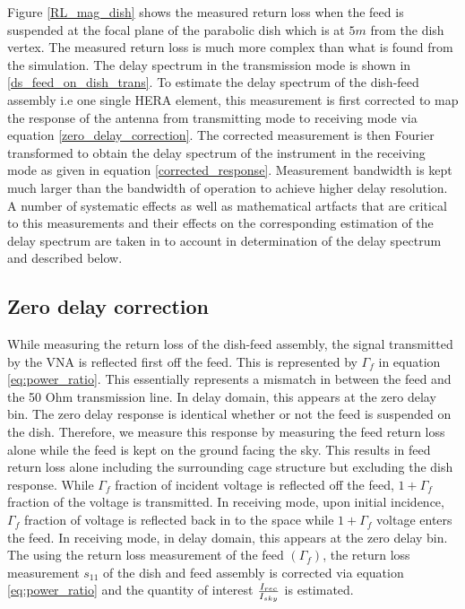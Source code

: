 \documentclass[twocolumn]{emulateapj}
\begin{document}
Figure \ref{RL_mag_dish} shows the measured return loss when the feed is suspended at the focal plane of the parabolic dish which is at $5m$ from the dish vertex. The measured return loss is much more complex than what is found from the simulation. The delay spectrum in the transmission mode is shown in \ref{ds_feed_on_dish_trans}. To estimate the delay spectrum of the dish-feed assembly i.e one single HERA element, this measurement is first corrected to map the response of the antenna from transmitting mode to receiving mode via equation \ref{zero_delay_correction}. The corrected measurement is then Fourier transformed to obtain the delay spectrum of the instrument in the receiving mode as given in equation \ref{corrected_response}. Measurement bandwidth is kept much larger than the bandwidth of operation to achieve higher delay resolution. A number of systematic effects as well as mathematical artfacts that are critical to this measurements and their effects on the corresponding estimation of the delay spectrum are taken in to account in determination of the delay spectrum and described below. 

\subsection{\textbf{Zero delay correction}}

While measuring the return loss of the dish-feed assembly, the signal transmitted by the VNA is reflected first off the feed. This is represented by $\Gamma_{f}$ in equation \ref{eq:power_ratio}. This essentially represents a mismatch in between the feed and the 50 Ohm transmission line. In delay domain, this appears at the zero delay bin. The zero delay response is identical whether or not the feed is suspended on the dish. Therefore, we measure this response by measuring the feed return loss alone while the feed is kept on the ground facing the sky. This results in feed return loss alone including the surrounding cage structure but excluding the dish response. While $\Gamma_{f}$ fraction of incident voltage is reflected off the feed, $1+\Gamma_{f}$ fraction of the voltage is transmitted. In receiving mode, upon initial incidence, $\Gamma_{f}$ fraction of voltage is reflected back in to the space while $1+\Gamma_{f}$ voltage enters the feed. In receiving mode, in delay domain, this appears at the zero delay bin.
The using the return loss measurement of the feed $(\Gamma_{f})$, the return loss measurement $s_{11}$ of the dish and feed assembly is corrected via equation \ref{eq:power_ratio} and the quantity of interest ${I_{rec}\over I_{sky}}$ is estimated. 
\end{document}
